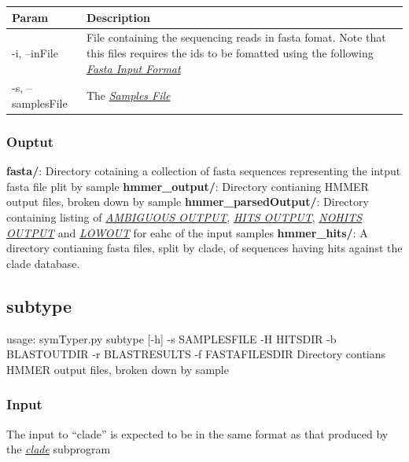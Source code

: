 \documentclass[letterpaper,10pt,english]{sphinxmanual}
\begin{document}
\begin{tabulary}{\linewidth}{|L|L|}
\hline
\textsf{\relax 
Param
} & \textsf{\relax 
Description
}\\
\hline
-i, --inFile
 & 
File containing the sequencing reads in fasta fomat. Note that this files requires the ids to be fomatted using the following {\hyperref[defs:inputformat]{\emph{Fasta Input Format}}}
\\

-s, --samplesFile
 & 
The {\hyperref[defs:samplefile]{\emph{Samples File}}}
\\
\hline\end{tabulary}



\subsubsection{Ouptut}
\label{CommanLine:ouptut}
\textbf{fasta/}: Directory cotaining a collection of fasta sequences representing the intput fasta file plit by sample
\textbf{hmmer\_output/}: Directory contianing HMMER output files, broken down by sample
\textbf{hmmer\_parsedOutput/}: Directory containing listing of {\hyperref[defs:ambiguousout]{\emph{AMBIGUOUS OUTPUT}}}, {\hyperref[defs:hitsout]{\emph{HITS OUTPUT}}}, {\hyperref[defs:nohitsout]{\emph{NOHITS OUTPUT}}} and {\hyperref[defs:lowout]{\emph{LOWOUT}}} for eahc of the input samples
\textbf{hmmer\_hits/}: A directory contianing fasta files, split by clade, of sequences having hits against the clade database.


\subsection{subtype}
\label{CommanLine:subtype}\label{CommanLine:id2}
usage: symTyper.py subtype {[}-h{]} -s SAMPLESFILE -H HITSDIR -b BLASTOUTDIR -r BLASTRESULTS -f FASTAFILESDIR
Directory contians HMMER output files, broken down by sample


\subsubsection{Input}
\label{CommanLine:id3}
The input to ``clade'' is expected to be in the same format as that produced by the {\hyperref[CommanLine:clade]{\emph{clade}}} subprogram
\end{document}
